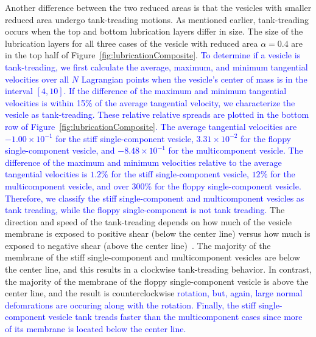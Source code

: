 \documentclass[twoside,twocolumn,9pt]{article}
\begin{document}
Another difference between the two reduced areas is that the vesicles
with smaller reduced area undergo tank-treading motions. As mentioned
earlier, tank-treading occurs when the top and bottom lubrication layers
differ in size. The size of the lubrication layers for all three cases
of the vesicle with reduced area $\alpha = 0.4$ are in the top half of
Figure~\ref{fig:lubricationComposite}. 
\textcolor{blue}
{
To determine if a vesicle is tank-treading, we first calculate the
average, maximum, and minimum tangential velocities over all $N$
Lagrangian points when the vesicle's center of mass is in the interval
$[4,10]$. If the difference of the maximum and minimum tangential
velocities is within 15\% of the average tangential velocity, we
characterize the vesicle as tank-treading. These relative relative
spreads are plotted in the bottom row of
Figure~\ref{fig:lubricationComposite}. The average tangential velocities
are $-1.00 \times 10^{-1}$ for the stiff single-component vesicle, $3.31
\times 10^{-2}$ for the floppy single-component vesicle, and $-8.48
\times 10^{-1}$ for the multicomponent vesicle. The difference of the
maximum and minimum velocities relative to the average tangential
velocities is $1.2\%$ for the stiff single-component vesicle, $12\%$ for
the multicomponent vesicle, and over $300\%$ for the floppy
single-component vesicle. Therefore, we classify the stiff
single-component and multicomponent vesicles as tank treading, while the
floppy single-component is not tank treading.}
The direction and speed of the tank-treading depends on how much of the
vesicle membrane is exposed to positive shear (below the center line)
versus how much is exposed to negative shear (above the center
line)~\cite{kao-bir-mis2009}. The majority of the membrane of the stiff
single-component and multicomponent vesicles are below the center line,
and this results in a clockwise tank-treading behavior. In contrast, the
majority of the membrane of the floppy single-component vesicle is above
the center line, and the result is counterclockwise 
\textcolor{blue}{
rotation, but, again, large normal defomrations are occuring along with
the rotation.
Finally, the stiff single-component vesicle tank treads faster than the
multicomponent cases since more of its membrane is located below the
center line.
}
\end{document}
